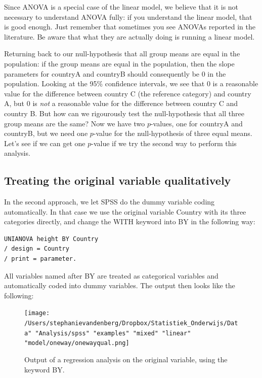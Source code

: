 \documentclass[]{report}\usepackage[]{graphicx}\usepackage[]{color}
\begin{document}
Since ANOVA is a special case of the linear model, we believe that it is not necessary to understand ANOVA fully: if you understand the linear model, that is good enough. Just remember that sometimes you see ANOVAs reported in the literature. Be aware that what they are actually doing is running a linear model.

Returning back to our null-hypothesis that all group means are equal in the population: if the group means are equal in the population, then the slope parameters for countryA and countryB should consequently be 0 in the population. Looking at the 95\% confidence intervals, we see that 0 is a reasonable value for the difference between country C (the reference category) and country A, but 0 is \textit{not} a reasonable value for the difference between country C and country B. But how can we rigourously test the null-hypothesis that all three group means are the same? Now we have two $p$-values, one for countryA and countryB, but we need one $p$-value for the null-hypothesis of three equal means. Let's see if we can get one $p$-value if we try the second way to perform this analysis.


\subsection{Treating the original variable qualitatively}

In the second approach, we let SPSS do the dummy variable coding automatically. In that case we use the original variable Country with its three categories directly, and change the WITH keyword into BY in the following way:

\begin{verbatim}
UNIANOVA height BY Country
/ design = Country
/ print = parameter.
\end{verbatim}

All variables named after BY are treated as categorical variables and automatically coded into dummy variables. The output then looks like the following:

\begin{figure}[h]
    \begin{center}
       \texttt{[image: /Users/stephanievandenberg/Dropbox/Statistiek\_Onderwijs/Data" "Analysis/spss" "examples" "mixed" "linear" "model/oneway/onewayqual.png]}
    \end{center}
    \caption{Output of a regression analysis on the original variable, using the keyword BY.}
    \label{fig:dummy_22}
\end{figure}
\end{document}
